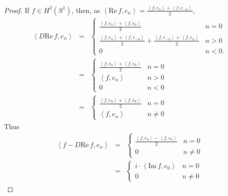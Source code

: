 \documentclass{article}
\newcommand{\inner}[2]{\left\langle #1, #2 \right\rangle}
\def\Re{\ensuremath{\mathrm{Re}}\,}
\def\Im{\ensuremath{\mathrm{Im}}\,}
\begin{document}
\begin{proof}
If $f \in H^2(S^1)$, then, as $\inner{\Re f}{e_n}=\frac{\inner{f}{e_n} +\overline{\inner{f}{e_{-n}}}}{2}$,
\begin{eqnarray*}
\inner{D\Re f}{e_n} & =&
\begin{cases}
\frac{ \inner{f}{e_0} +\overline{\inner{f}{e_0}}}{2}&n=0\\
\frac{\inner{f}{e_n} +\overline{\inner{f}{e_{-n}}}}{2}+\frac{\overline{\inner{f}{e_{-n}}} +\inner{f}{e_n}}{2}&n>0\\
0&n<0.
\end{cases}\\
&=&\begin{cases}
\frac{ \inner{f}{e_0} +\overline{\inner{f}{e_0}}}{2}&n=0\\
\inner{f}{e_n}&n>0\\
0&n<0
\end{cases}\\
&=&\begin{cases}
\frac{ \inner{f}{e_0} +\overline{\inner{f}{e_0}}}{2}&n=0\\
\inner{f}{e_n}&n \neq 0
\end{cases}
\end{eqnarray*}
Thus 
\begin{eqnarray*}
\inner{f-D\Re f}{e_n}&=&\begin{cases}
\frac{ \inner{f}{e_0} - \overline{\inner{f}{e_0}}}{2}&n=0\\
0&n \neq 0
\end{cases}\\
&=&\begin{cases}
i\cdot \inner{\Im f}{e_0}&n=0\\
0&n \neq 0
\end{cases}
\end{eqnarray*}
\end{proof}
\end{document}
